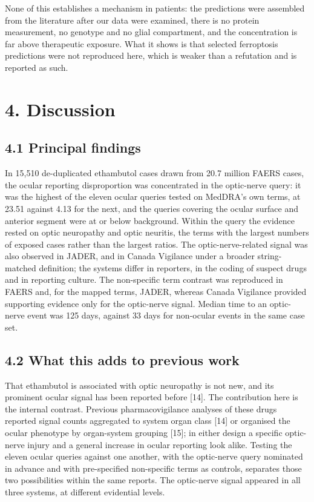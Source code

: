 \documentclass[12pt,a4paper]{article}
\begin{document}
None of this establishes a mechanism in patients: the predictions were assembled from the literature after our data were examined, there is no protein measurement, no genotype and no glial compartment, and the concentration is far above therapeutic exposure. What it shows is that selected ferroptosis predictions were not reproduced here, which is weaker than a refutation and is reported as such.

\section*{4. Discussion}

\subsection*{4.1 Principal findings}

In 15,510 de-duplicated ethambutol cases drawn from 20.7 million FAERS cases, the ocular reporting disproportion was concentrated in the optic-nerve query: it was the highest of the eleven ocular queries tested on MedDRA's own terms, at 23.51 against 4.13 for the next, and the queries covering the ocular surface and anterior segment were at or below background. Within the query the evidence rested on optic neuropathy and optic neuritis, the terms with the largest numbers of exposed cases rather than the largest ratios. The optic-nerve-related signal was also observed in JADER, and in Canada Vigilance under a broader string-matched definition; the systems differ in reporters, in the coding of suspect drugs and in reporting culture. The non-specific term contrast was reproduced in FAERS and, for the mapped terms, JADER, whereas Canada Vigilance provided supporting evidence only for the optic-nerve signal. Median time to an optic-nerve event was 125 days, against 33 days for non-ocular events in the same case set.

\subsection*{4.2 What this adds to previous work}

That ethambutol is associated with optic neuropathy is not new, and its prominent ocular signal has been reported before [14]. The contribution here is the internal contrast. Previous pharmacovigilance analyses of these drugs reported signal counts aggregated to system organ class [14] or organised the ocular phenotype by organ-system grouping [15]; in either design a specific optic-nerve injury and a general increase in ocular reporting look alike. Testing the eleven ocular queries against one another, with the optic-nerve query nominated in advance and with pre-specified non-specific terms as controls, separates those two possibilities within the same reports. The optic-nerve signal appeared in all three systems, at different evidential levels.
\end{document}
